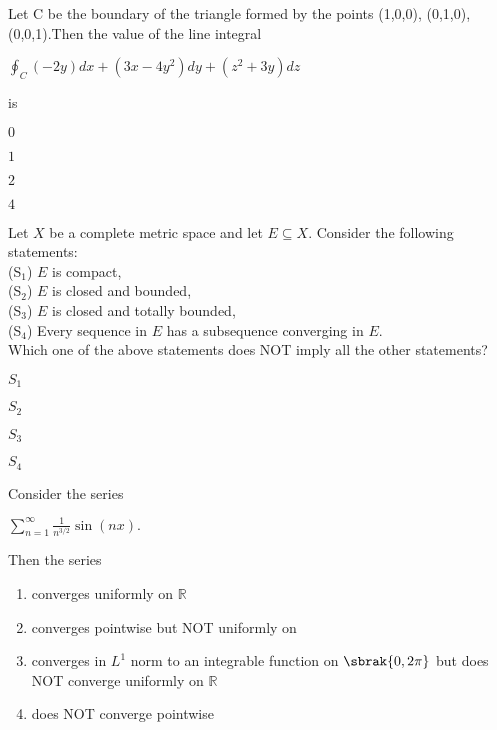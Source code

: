 \item Let  C  be the boundary of the triangle formed by the points  (1,0,0), (0,1,0), (0,0,1).Then the value of the line integral  \begin{center} $ \oint_C (-2y)dx + (3x-4y^2)dy + (z^2+3y)dz $ \end{center} is
\begin{enumerate}
\begin{multicols}{2}
\item $ 0 $
\item $ 1 $
\item $ 2 $
\item $ 4 $
\end{multicols}
\end{enumerate}
\item Let $X$ be a complete metric space and let $E \subseteq X$. Consider the following statements: \\
(S$_1$) $E$ is compact, \\
(S$_2$) $E$ is closed and bounded, \\
(S$_3$) $E$ is closed and totally bounded, \\
(S$_4$) Every sequence in $E$ has a subsequence converging in $E$. \\
Which one of the above statements does NOT imply all the other statements?  
\begin{enumerate}
\begin{multicols}{2}
\item $ S_1 $
\item $ S_2 $
\item $ S_3 $
\item $ S_4 $
\end{multicols}
\end{enumerate}
\item  Consider the series \begin{center} $\sum_{n=1}^{\infty} \frac{1}{n^{3/2}} \sin(nx).$ \end{center}  Then the series 
\begin{enumerate}
\item converges uniformly on  $\mathbb{R} $
\item converges pointwise but NOT uniformly on %
\item converges in  $L^1$ norm to an integrable function on  $\sbrak{0,2\pi}$ but does NOT converge uniformly on  $\mathbb{R}$ 
\item does NOT converge pointwise
\end{enumerate}
